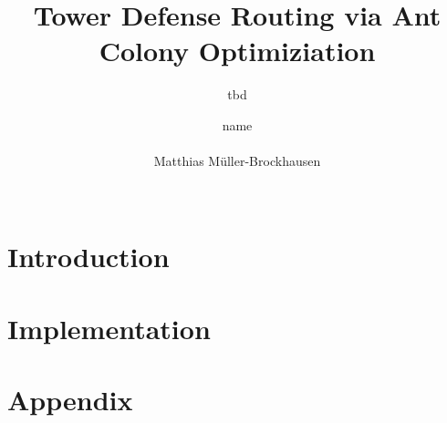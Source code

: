 \documentclass{acm_proc_article-sp}
\begin{document}
\title{Tower Defense Routing via Ant Colony Optimiziation}
\subtitle{tbd}

%
\author{
%
%
\alignauthor
	name\\
	\\
\alignauthor
	Matthias Müller-Brockhausen  \\
	\\
}

\date{}

\maketitle
\begin{abstract}

\end{abstract}


\section{Introduction}
\label{sec:introduction}


\section{Implementation}
\label{sec:implementation}


\section{Appendix}
\label{sec:appendix}


%

%
%
\balancecolumns
\end{document}
